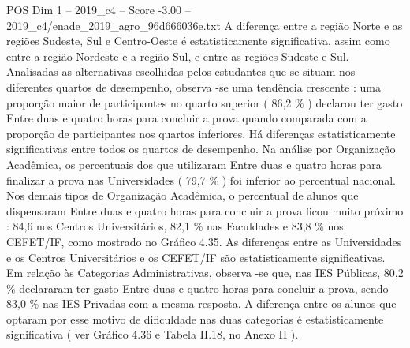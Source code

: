 \begin{textsample}{POS Dim 1 – 2019\_c4 – Score -3.00 – 2019\_c4/enade\_2019\_agro\_96d666036e.txt}
A diferença entre a região Norte e as regiões Sudeste, Sul e Centro-Oeste é estatisticamente significativa, assim como entre a região Nordeste e a região Sul, e entre as regiões Sudeste e Sul.
Analisadas as alternativas escolhidas pelos estudantes que se situam nos diferentes quartos de desempenho, observa -se uma tendência crescente : uma proporção maior de participantes no quarto superior ( 86,2 \% ) declarou ter gasto Entre duas e quatro horas para concluir a prova quando comparada com a proporção de participantes nos quartos inferiores.
Há diferenças estatisticamente significativas entre todos os quartos de desempenho.
Na análise por Organização Acadêmica, os percentuais dos que utilizaram Entre duas e quatro horas para finalizar a prova nas Universidades ( 79,7 \% ) foi inferior ao percentual nacional.
Nos demais tipos de Organização Acadêmica, o percentual de alunos que dispensaram Entre duas e quatro horas para concluir a prova ficou muito próximo : 84,6 nos Centros Universitários, 82,1 \% nas Faculdades e 83,8 \% nos CEFET/IF, como mostrado no Gráfico 4.35.
As diferenças entre as Universidades e os Centros Universitários e os CEFET/IF são estatisticamente significativas.
Em relação às Categorias Administrativas, observa -se que, nas IES Públicas, 80,2 \% declararam ter gasto Entre duas e quatro horas para concluir a prova, sendo 83,0 \% nas IES Privadas com a mesma resposta.
A diferença entre os alunos que optaram por esse motivo de dificuldade nas duas categorias é estatisticamente significativa ( ver Gráfico 4.36 e Tabela II.18, no Anexo II ).

\end{textsample}
